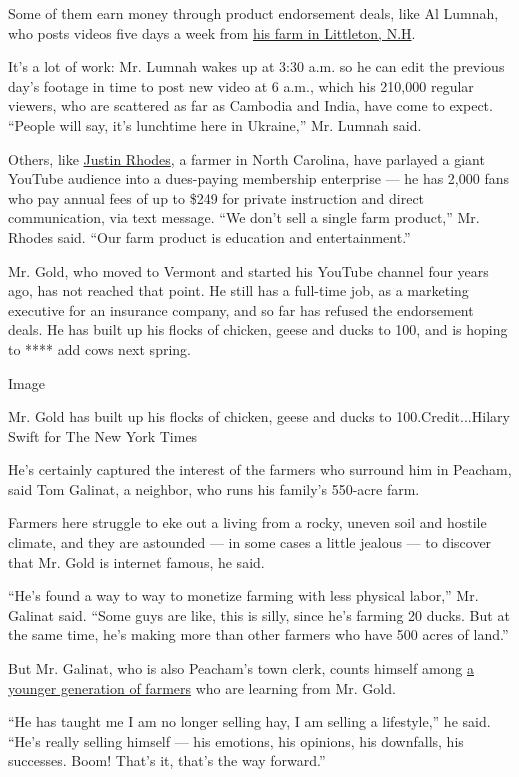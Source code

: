 Some of them earn money through product endorsement deals, like Al
Lumnah, who posts videos five days a week from
\href{https://www.youtube.com/c/DoingItGreen/about}{his farm in
Littleton, N.H}.

It's a lot of work: Mr. Lumnah wakes up at 3:30 a.m. so he can edit the
previous day's footage in time to post new video at 6 a.m., which his
210,000 regular viewers, who are scattered as far as Cambodia and India,
have come to expect. ``People will say, it's lunchtime here in
Ukraine,'' Mr. Lumnah said.

Others, like
\href{https://www.youtube.com/c/JustinRhodesVlog/featured}{Justin
Rhodes}, a farmer in North Carolina, have parlayed a giant YouTube
audience into a dues-paying membership enterprise --- he has 2,000 fans
who pay annual fees of up to \$249 for private instruction and direct
communication, via text message. ``We don't sell a single farm
product,'' Mr. Rhodes said. ``Our farm product is education and
entertainment.''

Mr. Gold, who moved to Vermont and started his YouTube channel four
years ago, has not reached that point. He still has a full-time job, as
a marketing executive for an insurance company, and so far has refused
the endorsement deals. He has built up his flocks of chicken, geese and
ducks to 100, and is hoping to **** add cows next spring.

Image

Mr. Gold has built up his flocks of chicken, geese and ducks to
100.Credit...Hilary Swift for The New York Times

He's certainly captured the interest of the farmers who surround him in
Peacham, said Tom Galinat, a neighbor, who runs his family's 550-acre
farm.

Farmers here struggle to eke out a living from a rocky, uneven soil and
hostile climate, and they are astounded --- in some cases a little
jealous --- to discover that Mr. Gold is internet famous, he said.

``He's found a way to way to monetize farming with less physical
labor,'' Mr. Galinat said. ``Some guys are like, this is silly, since
he's farming 20 ducks. But at the same time, he's making more than other
farmers who have 500 acres of land.''

But Mr. Galinat, who is also Peacham's town clerk, counts himself among
\href{https://www.foxfirerevivalfarm.com/}{a younger generation of
farmers} who are learning from Mr. Gold.

``He has taught me I am no longer selling hay, I am selling a
lifestyle,'' he said. ``He's really selling himself --- his emotions,
his opinions, his downfalls, his successes. Boom! That's it, that's the
way forward.''

